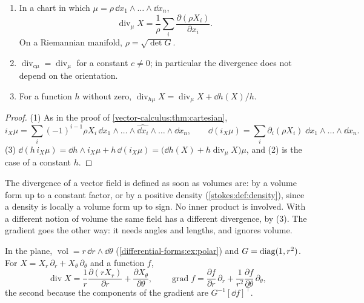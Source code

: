 \begin{notechapter}
\begin{proposition}\label{vector-calculus:prop:div-mu}
\begin{enumerate}[nosep]
  \item In a chart in which $\mu = \rho\,\dd x_1\wedge\dots\wedge
        \dd x_n$,
        \[
          \operatorname{div}_\mu X
          = \frac1\rho\sum_i\frac{\partial(\rho X_i)}{\partial x_i} .
        \]
        On a Riemannian manifold, $\rho = \sqrt{\det G}$.
  \item $\operatorname{div}_{c\mu} = \operatorname{div}_\mu$ for a
        constant $c\neq0$; in particular the divergence does not depend
        on the orientation.
  \item For a function $h$ without zero,
        $\operatorname{div}_{h\mu}X
        = \operatorname{div}_\mu X + \dd h(X)/h$.
\end{enumerate}
\end{proposition}

\begin{proof}
(1) As in the proof of \cref{vector-calculus:thm:cartesian},
\[
  i_X\mu = \sum_i(-1)^{i-1}\rho X_i\,
  \dd x_1\wedge\dots\wedge\widehat{\dd x_i}\wedge\dots\wedge\dd x_n ,
  \qquad
  \dd(i_X\mu) = \sum_i\partial_i(\rho X_i)\;
  \dd x_1\wedge\dots\wedge\dd x_n .
\]
(3)
$\dd(h\,i_X\mu) = \dd h\wedge i_X\mu + h\,\dd(i_X\mu)
= \bigl(\dd h(X) + h\operatorname{div}_\mu X\bigr)\mu$, and (2) is the
case of a constant $h$.
\end{proof}

\begin{keyidea}
The divergence of a vector field is defined as soon as volumes are:
by a volume form up to a constant factor, or by a positive density
(\cref{stokes:def:density}), since a density is locally a volume form
up to sign. No inner product is involved. With a different notion of
volume the same field has a different divergence, by (3). The gradient
goes the other way: it needs angles and lengths, and ignores volume.
\end{keyidea}

\begin{example}\label{vector-calculus:ex:polar}
In the plane, $\operatorname{vol} = r\,\dd r\wedge\dd\theta$
(\cref{differential-forms:ex:polar}) and
$G = \operatorname{diag}(1, r^2)$. For $X = X_r\,\partial_r + X_\theta\,\partial_\theta$
and a function $f$,
\[
  \operatorname{div}X
  = \frac1r\frac{\partial(rX_r)}{\partial r}
  + \frac{\partial X_\theta}{\partial\theta} ,
  \qquad
  \operatorname{grad}f
  = \frac{\partial f}{\partial r}\,\partial_r
  + \frac1{r^2}\frac{\partial f}{\partial\theta}\,\partial_\theta ,
\]
the second because the components of the gradient are
$G^{-1}[\dd f]^\top$.
\end{example}


\end{notechapter}
